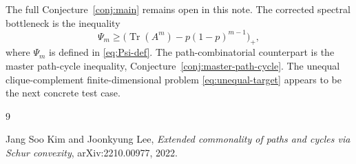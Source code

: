 \documentclass[11pt]{article}
\theoremstyle{definition}
\theoremstyle{remark}
\newcommand{\Tr}{\operatorname{Tr}}
\newcommand{\0}{\mathbf 0}
\begin{document}
The full Conjecture~\ref{conj:main} remains open in this note.  The corrected spectral bottleneck is the inequality
\[
        \Psi_m\ge\bigl(\Tr(A^m)-p(1-p)^{m-1}\bigr)_+,
\]
where $\Psi_m$ is defined in \eqref{eq:Psi-def}.  The path-combinatorial counterpart is the master path-cycle inequality, Conjecture~\ref{conj:master-path-cycle}.  The unequal clique-complement finite-dimensional problem \eqref{eq:unequal-target} appears to be the next concrete test case.

\begin{thebibliography}{9}

Jang Soo Kim and Joonkyung Lee,
\emph{Extended commonality of paths and cycles via Schur convexity},
arXiv:2210.00977, 2022.

\end{thebibliography}
\end{document}
